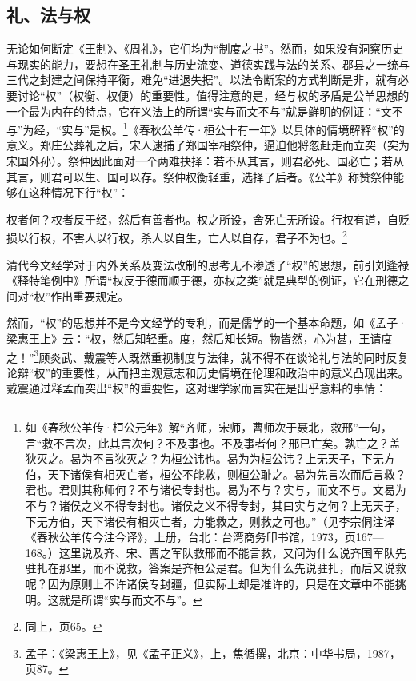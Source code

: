 \documentclass[a4paper, 12pt, openright]{ctexbook}
\renewenvironment{quote}
  {\list{}{\rightmargin2\ccwd \leftmargin2\ccwd \itemindent=2\ccwd \listparindent=2\ccwd}%
   \item\relax\small\kaishu\color{black}}
  {\endlist}
\begin{document}
\subsection{礼、法与权}

无论如何断定《王制》、《周礼》，它们均为“制度之书”。然而，如果没有洞察历史与现实的能力，要想在圣王礼制与历史流变、道德实践与法的关系、郡县之一统与三代之封建之间保持平衡，难免“进退失据”。以法令断案的方式判断是非，就有必要讨论“权”（权衡、权便）的重要性。值得注意的是，经与权的矛盾是公羊思想的一个最为内在的特点，它在义法上的所谓“实与而文不与”就是鲜明的例证：“文不与”为经，“实与”是权。\footnote{如《春秋公羊传·桓公元年》解“齐师，宋师，曹师次于聂北，救邢”一句，言“救不言次，此其言次何？不及事也。不及事者何？邢已亡矣。孰亡之？盖狄灭之。曷为不言狄灭之？为桓公讳也。曷为为桓公讳？上无天子，下无方伯，天下诸侯有相灭亡者，桓公不能救，则桓公耻之。曷为先言次而后言救？君也。君则其称师何？不与诸侯专封也。曷为不与？实与，而文不与。文曷为不与？诸侯之义不得专封也。诸侯之义不得专封，其曰实与之何？上无天子，下无方伯，天下诸侯有相灭亡者，力能救之，则救之可也。”（见李宗侗注译《春秋公羊传今注今译》，上册，台北：台湾商务印书馆，1973，页167—168。）这里说及齐、宋、曹之军队救邢而不能言救，又问为什么说齐国军队先驻扎在那里，而不说救，答案是齐桓公是君。但为什么先说驻扎，而后又说救呢？因为原则上不许诸侯专封疆，但实际上却是准许的，只是在文章中不能挑明。这就是所谓“实与而文不与”。}《春秋公羊传·桓公十有一年》以具体的情境解释“权”的意义。郑庄公葬礼之后，宋人逮捕了郑国宰相祭仲，逼迫他将忽赶走而立突（突为宋国外孙）。祭仲因此面对一个两难抉择：若不从其言，则君必死、国必亡；若从其言，则君可以生、国可以存。祭仲权衡轻重，选择了后者。《公羊》称赞祭仲能够在这种情况下行“权”：

\begin{quote}
权者何？权者反于经，然后有善者也。权之所设，舍死亡无所设。行权有道，自贬损以行权，不害人以行权，杀人以自生，亡人以自存，君子不为也。\footnote{同上，页65。}
\end{quote}

清代今文经学对于内外关系及变法改制的思考无不渗透了“权”的思想，前引刘逢禄《释特笔例中》所谓“权反于德而顺于德，亦权之类”就是典型的例证，它在刑德之间对“权”作出重要规定。

然而，“权”的思想并不是今文经学的专利，而是儒学的一个基本命题，如《孟子·梁惠王上》云：“权，然后知轻重。度，然后知长短。物皆然，心为甚，王请度之！”\footnote{孟子：《梁惠王上》，见《孟子正义》，上，焦循撰，北京：中华书局，1987，页87。}顾炎武、戴震等人既然重视制度与法律，就不得不在谈论礼与法的同时反复论辩“权”的重要性，从而把主观意志和历史情境在伦理和政治中的意义凸现出来。戴震通过释孟而突出“权”的重要性，这对理学家而言实在是出乎意料的事情：
\end{document}
